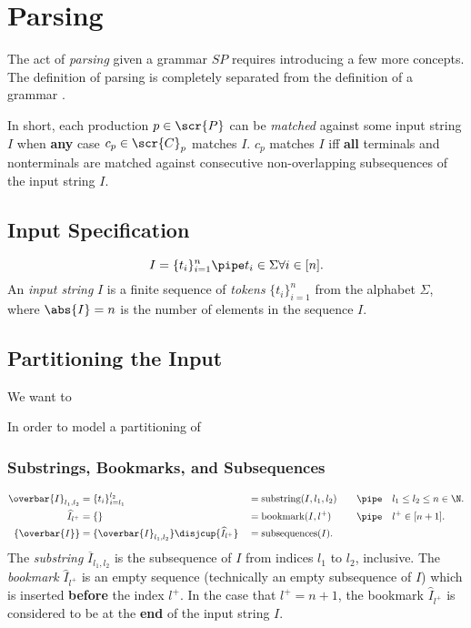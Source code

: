 \documentclass[10pt]{article}
\begin{document}
\section{Parsing}
\label{sec:parsing}
The act of \textit{parsing} given a grammar $SP$ requires introducing a few more concepts. The definition of parsing is completely separated from the definition of a grammar .

In short, each production $p \in \scr{P}$ can be \textit{matched} against some input string $I$ when \textbf{any} case $c_p \in \scr{C}_p$ matches $I$. $c_p$ matches $I$ iff \textbf{all} terminals and nonterminals are matched against consecutive non-overlapping subsequences of the input string $I$.

\subsection{Input Specification}
\label{sec:input-specification}

\begin{equation}
  \label{eq:input-string-tokens}
  I = \{t_i\}_{i=1}^n \pipe t_i \in \Sigma \forall i \in [n].
\end{equation}
An \textit{input string} $I$ is a finite sequence of \textit{tokens} $\{t_i\}_{i=1}^n$ from the alphabet $\Sigma$, where $\abs{I} = n$ is the number of elements in the sequence $I$.

\subsection{Partitioning the Input}
\label{sec:partitioning-the-input}
We want to

In order to model a partitioning of

\subsubsection{Substrings, Bookmarks, and Subsequences}
\label{sec:subsequences}

\begin{align}
  \label{eq:subsequences}
  \overbar{I}_{l_1,l_2} &= \{t_i\}_{i=l_1}^{l_2} &&= \text{substring}(I, l_1, l_2) &&&\pipe &&&l_1 \le l_2 \le n \in \N. \\
  \widehat{I}_{l^+} &= \{\} &&= \text{bookmark}(I, l^+) &&&\pipe &&&l^+ \in [n + 1]. \\
  \{\overbar{I}\} &= \{\overbar{I}_{l_1,l_2}\} \disjcup \{\widehat{I}_{l^+}\} &&= \text{subsequences}(I).
\end{align}
The \textit{substring} $\overbar{I}_{l_1,l_2}$ is the subsequence of $I$ from indices $l_1$ to $l_2$, inclusive. The \textit{bookmark} $\widehat{I}_{l^+}$ is an empty sequence (technically an empty subsequence of $I$) which is inserted \textbf{before} the index $l^+$. In the case that $l^+ = n + 1$, the bookmark $\widehat{I}_{l^+}$ is considered to be at the \textbf{end} of the input string $I$.
\end{document}
